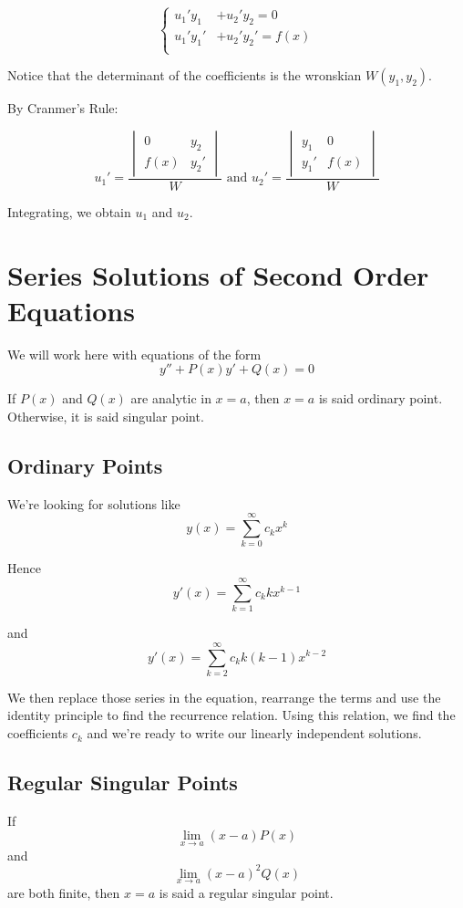 \documentclass[12pt,a4paper]{article}
\begin{document}
\[
\left\{\begin{split}
u_1'y_1&+u_2'y_2=0 \\
u_1'y_1'&+u_2'y_2'=f(x) \\ 
\end{split}\right.
\]

Notice that the determinant of the coefficients is the wronskian $W(y_1,y_2)$.

By Cranmer's Rule:

\[
u_1' = \frac{\begin{vmatrix} 0 & y_2 \\ f(x) & y_2' \end{vmatrix}}{W} \text{ and } u_2' = \frac{\begin{vmatrix} y_1 & 0 \\ y_1' & f(x) \end{vmatrix}}{W}
\]

Integrating, we obtain $u_1$ and $u_2$.

\section{Series Solutions of Second Order Equations}

We will work here with equations of the form 
\[
y'' + P(x)y' + Q(x) = 0
\]

If $P(x)$ and $Q(x)$ are analytic in $x=a$, then $x = a$ is said ordinary point. Otherwise, it is said singular point.

\subsection{Ordinary Points}

We're looking for solutions like
\[
y(x) = \sum_{k=0}^{\infty} c_k x^k
\]

Hence
\[
y'(x) =  \sum_{k=1}^{\infty} c_k k x^{k-1}
\]

and
\[
y'(x) =  \sum_{k=2}^{\infty} c_k k (k-1) x^{k-2}
\]

We then replace those series in the equation, rearrange the terms and use the identity principle to find the recurrence relation. Using this relation, we find the coefficients $c_k$ and we're ready to write our linearly independent solutions.

\subsection{Regular Singular Points}

If $$\lim_{x \to a} (x-a) P(x)$$ and $$\lim_{x \to a} (x-a)^2 Q(x)$$ are both finite, then $x=a$ is said a regular singular point.
\end{document}
